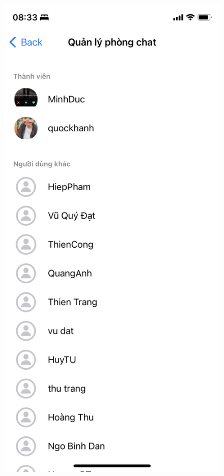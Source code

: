 \documentclass[../DoAn.tex]{subfiles}
\begin{document}
\begin{figure}[H]
\begin{minipage}{0.5\textwidth}
\includegraphics[width=0.95\linewidth]{Hinhve/Application/Managing_Chatbox.png}

\end{minipage}
\end{figure}
\end{document}
